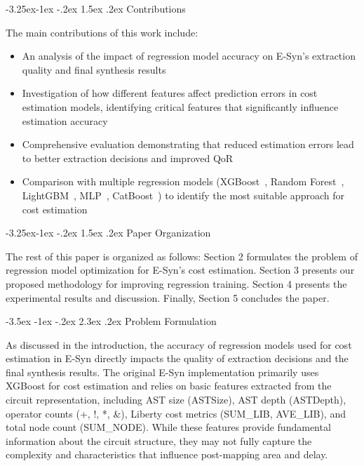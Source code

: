 \documentclass[10pt,twocolumn]{article}
\makeatletter
\renewcommand\section{\@startsection {section}{1}{\z@}%
                                   {-3.5ex \@plus -1ex \@minus -.2ex}%
                                   {2.3ex \@plus.2ex}%
                                   {\normalfont\large\bfseries}}
\renewcommand\subsection{\@startsection{subsection}{2}{\z@}%
                                     {-3.25ex\@plus -1ex \@minus -.2ex}%
                                     {1.5ex \@plus .2ex}%
                                     {\normalfont\normalsize\bfseries}}
\makeatother
\begin{document}
\subsection{Contributions}

The main contributions of this work include:

\begin{itemize}
\item An analysis of the impact of regression model accuracy on E-Syn's extraction quality and final synthesis results
\item Investigation of how different features affect prediction errors in cost estimation models, identifying critical features that significantly influence estimation accuracy
\item Comprehensive evaluation demonstrating that reduced estimation errors lead to better extraction decisions and improved QoR
\item Comparison with multiple regression models (XGBoost~\cite{xgboost}, Random Forest~\cite{random_forest}, LightGBM~\cite{lightgbm}, MLP~\cite{deep_learning}, CatBoost~\cite{catboost}) to identify the most suitable approach for cost estimation
\end{itemize}

\subsection{Paper Organization}

The rest of this paper is organized as follows: Section 2 formulates the problem of regression model optimization for E-Syn's cost estimation. Section 3 presents our proposed methodology for improving regression training. Section 4 presents the experimental results and discussion. Finally, Section 5 concludes the paper.

\section{Problem Formulation}

As discussed in the introduction, the accuracy of regression models used for cost estimation in E-Syn directly impacts the quality of extraction decisions and the final synthesis results. The original E-Syn implementation primarily uses XGBoost for cost estimation and relies on basic features extracted from the circuit representation, including AST size (ASTSize), AST depth (ASTDepth), operator counts (+, !, *, \&), Liberty cost metrics (SUM\_LIB, AVE\_LIB), and total node count (SUM\_NODE). While these features provide fundamental information about the circuit structure, they may not fully capture the complexity and characteristics that influence post-mapping area and delay.
\end{document}
